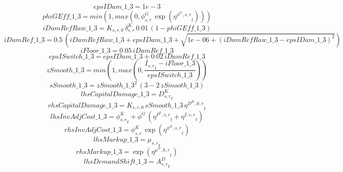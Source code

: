 \begin{dmath*}
epsIDam\_1\_3 = 1e-3
\end{dmath*}
\begin{dmath*}
phiGEff\_1\_3 = min(1,max(0,{{\phi^{G}_{s,r}}}\, \exp\left({{\eta^{\phi^{G},s,r}}}_{t}\right)))
\end{dmath*}
\begin{dmath*}
iDamRefRaw\_1\_3 = {{K_{s,r,0}}}\, {{\delta^{K}_{s,r}}}\, 0.01\, \left(1-{phiGEff\_1\_3}\right)
\end{dmath*}
\begin{dmath*}
iDamRef\_1\_3 = 0.5\, \left({iDamRefRaw\_1\_3}+{epsIDam\_1\_3}+\sqrt{1e-06+\left({iDamRefRaw\_1\_3}-{epsIDam\_1\_3}\right)^{2}}\right)
\end{dmath*}
\begin{dmath*}
iFloor\_1\_3 = 0.05\, {iDamRef\_1\_3}
\end{dmath*}
\begin{dmath*}
epsISwitch\_1\_3 = {epsIDam\_1\_3}+0.02\, {iDamRef\_1\_3}
\end{dmath*}
\begin{dmath*}
zSmooth\_1\_3 = min(1,max(0,\frac{{{I_{s,r}}}_{t}-{iFloor\_1\_3}}{{epsISwitch\_1\_3}}))
\end{dmath*}
\begin{dmath*}
sSmooth\_1\_3 = {zSmooth\_1\_3}^{2}\, \left(3-2\, {zSmooth\_1\_3}\right)
\end{dmath*}
\begin{dmath*}
lhsCapitalDamage\_1\_3 = {{D^K_{s,r}}}_{t}
\end{dmath*}
\begin{dmath*}
rhsCapitalDamage\_1\_3 = {{K_{s,r,0}}}\, {sSmooth\_1\_3}\, {{\eta^{D^{K},k,r}}}_{t}
\end{dmath*}
\begin{dmath*}
lhsInvAdjCost\_1\_3 = {{\phi^K_{s,r}}}_{t}+{{\phi^{G}}}\, \left({{\eta^{P^k,s,r}}}_{t}+{{\eta^{I,s,r}}}_{t}\right)
\end{dmath*}
\begin{dmath*}
rhsInvAdjCost\_1\_3 = {{\phi^{K}_{s,r}}}\, \exp\left({{\eta^{\phi^{K},{s,r}}}}_{t}\right)
\end{dmath*}
\begin{dmath*}
lhsMarkup\_1\_3 = {{\mu_{s,r}}}_{t}
\end{dmath*}
\begin{dmath*}
rhsMarkup\_1\_3 = \exp\left({{\eta^{\mu^{N},k,r}}}_{t}\right)
\end{dmath*}
\begin{dmath*}
lhsDemandShift\_1\_3 = {{A^{D}_{s,r}}}_{t}
\end{dmath*}
